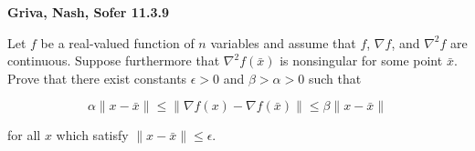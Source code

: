 \textbf{Griva, Nash, Sofer 11.3.9}

Let $f$ be a real-valued function of $n$ variables and assume that $f$, $\nabla f$, and $\nabla^2 f$ are continuous.
Suppose furthermore that $\nabla^2 f(\bar{x})$ is nonsingular for some point $\bar{x}$. Prove that there exist constants
$\epsilon > 0$ and $\beta > \alpha > 0$ such that

$$
\alpha \lVert x - \bar{x} \rVert \le \lVert \nabla f(x) - \nabla f(\bar{x}) \rVert \le \beta \lVert x - \bar{x} \rVert 
$$

for all $x$ which satisfy $\lVert x - \bar{x} \rVert \le \epsilon$.

\begin{solution}
    \ \\
    \vfill
\end{solution}
